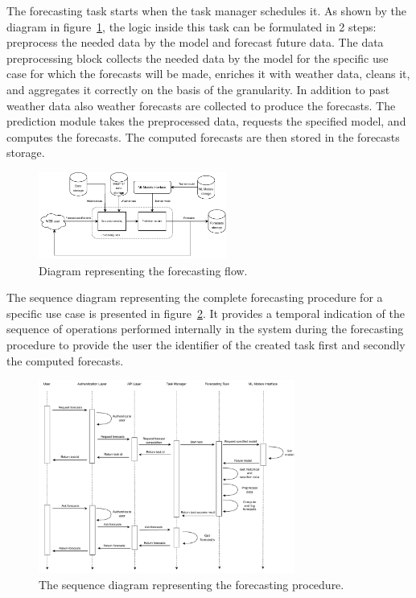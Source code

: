 The forecasting task starts when the task manager schedules it.
As shown by the diagram in figure~\ref{fig:forecastflow}, the logic inside this task can be formulated in 2 steps: preprocess the needed data by the model and forecast future data.
The data preprocessing block collects the needed data by the model for the specific use case for which the forecasts will be made, enriches it with weather data, cleans it, and aggregates it correctly on the basis of the granularity.
In addition to past weather data also weather forecasts are collected to produce the forecasts.
The prediction module takes the preprocessed data, requests the specified model, and computes the forecasts.
The computed forecasts are then stored in the forecasts storage.

\begin{figure}[H]
\centering
\includegraphics[width=0.55\textwidth]{images/architecture_forecasting_flow}
\caption{Diagram representing the forecasting flow.}
\label{fig:forecastflow}
\end{figure}

The sequence diagram representing the complete forecasting procedure for a specific use case is presented in figure~\ref{fig:forecastingsequence}.
It provides a temporal indication of the sequence of operations performed internally in the system during the forecasting procedure to provide the user the identifier of the created task first and secondly the computed forecasts.

\begin{figure}[H]
\centering
\includegraphics[width=0.75\textwidth]{images/architecture_forecasting_sequence}
\caption{The sequence diagram representing the forecasting procedure.}
\label{fig:forecastingsequence}
\end{figure}


